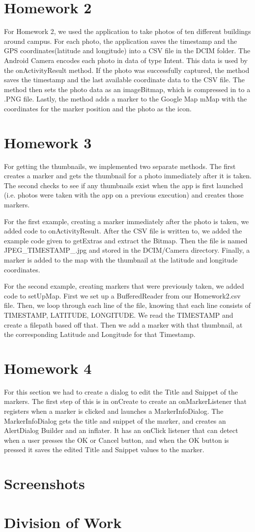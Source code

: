 \documentclass[]{article}
\begin{document}
\section{Homework 2}
For Homework 2, we used the application to take photos of ten different buildings around campus. For each photo, the application saves the timestamp and the GPS coordinates(latitude and longitude) into a CSV file in the DCIM folder. The Android Camera encodes each photo in data of type Intent. This data is used by the onActivityResult method. If the photo was successfully captured, the method saves the timestamp and the last available coordinate data to the CSV file. The method then sets the photo data as an imageBitmap, which is compressed in to a .PNG file. Lastly, the method adds a marker to the Google Map mMap with the coordinates for the marker position and the photo as the icon.

\section{Homework 3}
For getting the thumbnails, we implemented two separate methods. The first creates a marker and gets the thumbnail for a photo immediately after it is taken. The second checks to see if any thumbnails exist when the app is first launched (i.e. photos were taken with the app on a previous execution) and creates those markers.

For the first example, creating a marker immediately after the photo is taken, we added code to onActivityResult. After the CSV file is written to, we added the example code given to getExtras and extract the Bitmap. Then the file is named JPEG\_TIMESTAMP\_.jpg and stored in the DCIM/Camera directory. Finally, a marker is added to the map with the thumbnail at the latitude and longitude coordinates.

For the second example, creating markers that were previously taken, we added code to setUpMap. First we set up a BufferedReader from our Homework2.csv file. Then, we loop through each line of the file, knowing that each line consists of TIMESTAMP, LATITUDE, LONGITUDE. We read the TIMESTAMP and create a filepath based off that. Then we add a marker with that thumbnail, at the corresponding Latitude and Longitude for that Timestamp. 

\section{Homework 4}
For this section we had to create a dialog to edit the Title and Snippet of the markers. The first step of this is in onCreate to create an onMarkerListener that registers when a marker is clicked and launches a MarkerInfoDialog. The MarkerInfoDialog gets the title and snippet of the marker, and creates an AlertDialog Builder and an inflater. It has an onClick listener that can detect when a user presses the OK or Cancel button, and when the OK button is pressed it saves the edited Title and Snippet values to the marker. 

\section{Screenshots}
\section{Division of Work}
\end{document}
